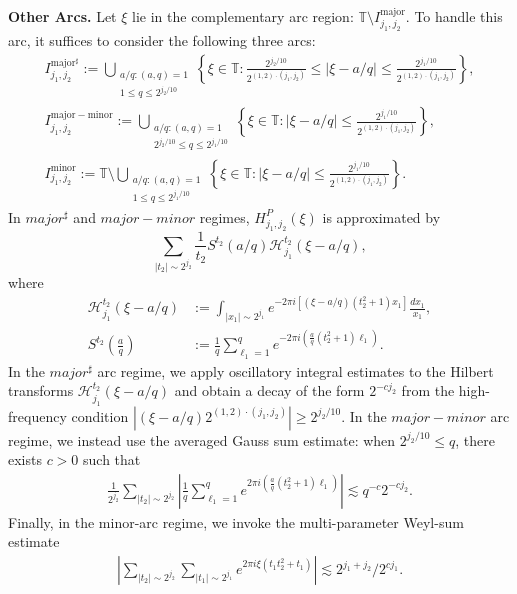 \documentclass[10pt,a4paper]{amsart}
\numberwithin{equation}{section}
\begin{document}
\noindent\textbf{Other Arcs.}
	Let $\xi$ lie  in the complementary arc region:
	$
 \mathbb{T} \setminus I^{\mathrm{major}}_{j_1,j_2}.
	$ To handle this arc, it suffices to consider the following three arcs:
\begin{align}
	I^{\mathrm{major^{\sharp}}}_{j_1,j_2}
	:=
	\bigcup_{\substack{a/q : (a,q)=1 \\ 1\le q \le 2^{j_2/10}}}
	\left\{
	\xi \in \mathbb{T} : \frac{2^{j_2/10}}{2^{(1,2)\cdot(j_1,j_2)}}\le
	|\xi - a/q| \le \frac{2^{j_1/10}}{2^{(1,2)\cdot(j_1,j_2)}}
	\right\},\label{y}\\
		I^{\mathrm{major-minor}}_{j_1,j_2}
	:=
	\bigcup_{\substack{a/q : (a,q)=1 \\ 2^{j_2/10}\le q \le 2^{j_1/10}}}
	\left\{
	\xi \in \mathbb{T} :
	|\xi - a/q| \le \frac{2^{j_1/10}}{2^{(1,2)\cdot(j_1,j_2)}}
	\right\},\label{y1}\\
		I^{\mathrm{minor}}_{j_1,j_2}
	:=\mathbb{T}\setminus
	\bigcup_{\substack{a/q : (a,q)=1 \\ 1\le q \le 2^{j_1/10}}}
	\left\{
	\xi \in \mathbb{T} :
	|\xi - a/q| \le \frac{2^{j_1/10}}{2^{(1,2)\cdot(j_1,j_2)}}
	\right\}.\label{y2}
\end{align}
In  $major^{\sharp}$ and $major-minor$ regimes,   $H_{j_1,j_2}^{P}(\xi)$ is approximated by  $$\sum_{|t_2|\sim 2^{j_2}}\frac{1}{t_2}S^{t_2}(a/q)\mathcal{H}^{t_2}_{j_1}(\xi-a/q),$$ where \begin{align*}
	\mathcal{H}_{j_1}^{t_2}(\xi-a/q)&:=\int_{|x_1|\sim 2^{j_1}} e^{-2\pi i[(\xi-a/q)(t_2^{2}+1) x_1]}\frac{dx_1}{x_1},\\
	S^{t_2}\left(\frac{a}{q}\right)&:=\frac{1}{q}\sum_{\ell_1=1}^q e^{-2\pi i \left(\frac{a}{q}(t_2^{2}+1)\ell_1\right)}.
\end{align*} In the  $major^{\sharp}$ arc regime, we apply oscillatory integral estimates to the Hilbert transforms $\mathcal{H}_{j_1}^{t_2}(\xi-a/q)$ and obtain a decay of the form $2^{-cj_2}$ from the high-frequency condition   $ |(\xi-a/q) 2^{(1,2)\cdot(j_1,j_2)}| \ge 2^{ j_2/10}$.	
 In  the  $major-minor$ arc regime, we instead use the averaged Gauss sum estimate: when  $2^{j_2/10}\le q$, there exists $c>0$ such that \begin{align}\label{u1}
	\frac{1}{2^{j_2}}\sum_{|t_2|\sim 2^{j_2}}\left|\frac{1}{q}\sum_{\ell_1=1}^q e^{2\pi i\left(\frac{a}{q}(t_2^{2}+1)\ell_1\right)}\right|\lesssim q^{-c}2^{-cj_2}.\end{align} Finally, in the minor-arc regime, we invoke the multi-parameter Weyl-sum estimate \begin{align}\label{u2}
	\left|\sum_{|t_2|\sim 2^{j_2}}\sum_{|t_1|\sim 2^{j_1}}e^{2\pi i \xi( t_1t_2^{2}+t_1)}\right|\lesssim 2^{j_1+j_2}/2^{cj_1}.
	\end{align} 
\end{document}
